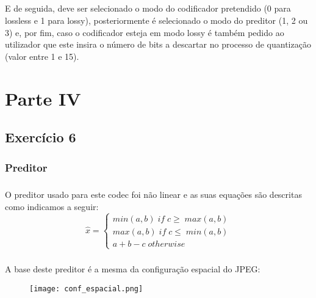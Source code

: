 \documentclass{report}
\begin{document}
\paragraph{}
E de seguida, deve ser selecionado o modo do codificador pretendido (0 para lossless e 1 para lossy), posteriormente é selecionado o modo do preditor (1, 2 ou 3) e, por fim, caso o codificador esteja em modo lossy é também pedido ao utilizador que este insira o número de bits a descartar no processo de quantização (valor entre 1 e 15). 

\chapter{Parte IV}
\label{chap.ParteIV}
\section{Exercício 6}

\paragraph{}
\subsection*{Preditor}
\paragraph{}
O preditor usado para este codec foi não linear e as suas equações são descritas como indicamos a seguir:
\begin{equation}
\hat{x}=
\left\{
\begin{array}{c}
     min(a, b) \; if \; c \geq \; max(a, b)  \\
     max(a, b) \; if \; c \leq \; min(a, b)\\
     a + b - c \; otherwise
\end{array}
\right.  
\end{equation}

\paragraph{}

A base deste preditor é a mesma da configuração espacial do JPEG:
\begin{center}
    \begin{figure} [h!]
    \centering
    \centering
    \texttt{[image: conf\_espacial.png]}
    \label{fig:configuracao_espacial}
    \end{figure}
\end{center}
\end{document}
